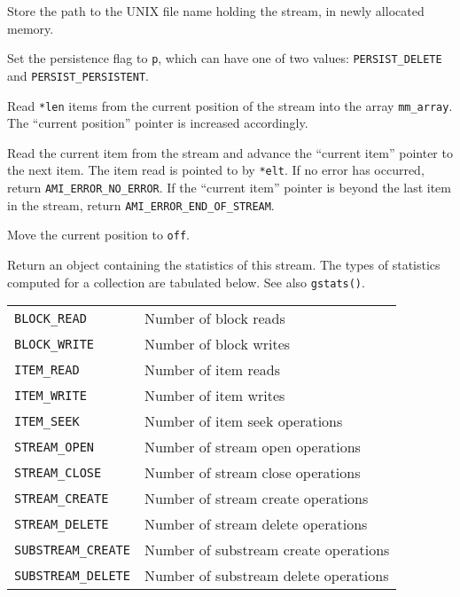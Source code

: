    {Store the path
  to the UNIX file name holding the stream, in newly allocated
  memory.}

   {Set the persistence flag
  to \lstinline|p|, which can have one of two values:
  \lstinline|PERSIST_DELETE| and \lstinline|PERSIST_PERSISTENT|.}
  
  {Read
  \lstinline|*len| items from the current position of the stream into
  the array \lstinline|mm_array|. The ``current position'' pointer is
  increased accordingly.  }  

  {Read the current item from the
  stream and advance the ``current item'' pointer to the next item.
  The item read is pointed to by \lstinline|*elt|. If no error has
  occurred, return \lstinline|AMI_ERROR_NO_ERROR|. If the ``current
  item'' pointer is beyond the last item in the stream, return
  \lstinline|AMI_ERROR_END_OF_STREAM|.}  
    
  {Move the current position to \lstinline|off|.}
    

    {Return an object containing the statistics of this
      stream. The types of
        statistics computed for a collection are tabulated
        below. See also \lstinline|gstats()|.\\[1mm]
      \begin{tabular}{|l|l|} \hline \lstinline|BLOCK_READ| & Number of
        block reads\\ \lstinline|BLOCK_WRITE| & Number of block
        writes \\ \lstinline|ITEM_READ| & Number of item reads\\
        \lstinline|ITEM_WRITE| & Number of item writes\\ 
        \lstinline|ITEM_SEEK| & Number of item seek operations\\ 
        \lstinline|STREAM_OPEN| & Number of stream open operations\\ 
        \lstinline|STREAM_CLOSE| & Number of stream close operations
        \\ \lstinline|STREAM_CREATE| & Number of stream create
        operations\\ \lstinline|STREAM_DELETE| & Number of stream
        delete operations \\ \lstinline|SUBSTREAM_CREATE| & Number of
        substream create operations\\ \lstinline|SUBSTREAM_DELETE| &
        Number of substream delete operations \\ \hline \end{tabular}
    }

